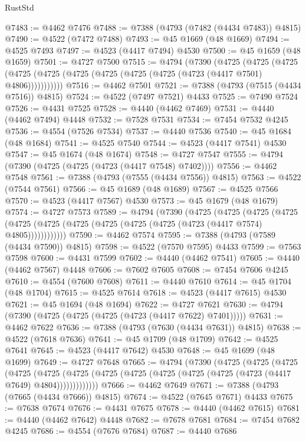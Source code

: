 \begin{lexlean}{RustStd}
\begin{coremodule}
{\begin{coremodule}
{{{{{{{{{{{{{{{{{{{{{{{{{{{{{{{{{{{{{{{{{{{{{{{{{{{{{{{{{{{{@7483 := @4462 @7476
@7488 := @7388 (@4793 (@7482 (@4434 @7483)) @4815)
@7490 := @4522 (@7472 @7488)
@7493 := @45 @1669 (@48 @1669)
@7494 := @4525 @7493
@7497 := @4523 (@4417 @7494) @4530
@7500 := @45 @1659 (@48 @1659)
@7501 := @4727 @7500
@7515 := @4794
    (@7390
      (@4725
        (@4725
          (@4725 (@4725 (@4725 (@4725 (@4725 (@4725 (@4725 (@4723 (@4417 @7501) @4806)))))))))))
@7516 := @4462 @7501
@7521 := @7388 (@4793 (@7515 (@4434 @7516)) @4815)
@7524 := @4522 (@7497 @7521) @4433
@7525 := @7490 @7524
@7526 := @4431 @7525
@7528 := @4440 (@4462 @7469)
@7531 := @4440 (@4462 @7494) @4448
@7532 := @7528 @7531
@7534 := @7454 @7532 @4245
@7536 := @4554 (@7526 @7534)
@7537 := @4440 @7536
@7540 := @45 @1684 (@48 @1684)
@7541 := @4525 @7540
@7544 := @4523 (@4417 @7541) @4530
@7547 := @45 @1674 (@48 @1674)
@7548 := @4727 @7547
@7555 := @4794 (@7390 (@4725 (@4725 (@4723 (@4417 @7548) @7402))))
@7556 := @4462 @7548
@7561 := @7388 (@4793 (@7555 (@4434 @7556)) @4815)
@7563 := @4522 (@7544 @7561)
@7566 := @45 @1689 (@48 @1689)
@7567 := @4525 @7566
@7570 := @4523 (@4417 @7567) @4530
@7573 := @45 @1679 (@48 @1679)
@7574 := @4727 @7573
@7589 := @4794
    (@7390
      (@4725
        (@4725
          (@4725
            (@4725 (@4725 (@4725 (@4725 (@4725 (@4725 (@4725 (@4723 (@4417 @7574) @4805))))))))))))
@7590 := @4462 @7574
@7595 := @7388 (@4793 (@7589 (@4434 @7590)) @4815)
@7598 := @4522 (@7570 @7595) @4433
@7599 := @7563 @7598
@7600 := @4431 @7599
@7602 := @4440 (@4462 @7541)
@7605 := @4440 (@4462 @7567) @4448
@7606 := @7602 @7605
@7608 := @7454 @7606 @4245
@7610 := @4554 (@7600 @7608)
@7611 := @4440 @7610
@7614 := @45 @1704 (@48 @1704)
@7615 := @4525 @7614
@7618 := @4523 (@4417 @7615) @4530
@7621 := @45 @1694 (@48 @1694)
@7622 := @4727 @7621
@7630 := @4794 (@7390 (@4725 (@4725 (@4725 (@4723 (@4417 @7622) @7401)))))
@7631 := @4462 @7622
@7636 := @7388 (@4793 (@7630 (@4434 @7631)) @4815)
@7638 := @4522 (@7618 @7636)
@7641 := @45 @1709 (@48 @1709)
@7642 := @4525 @7641
@7645 := @4523 (@4417 @7642) @4530
@7648 := @45 @1699 (@48 @1699)
@7649 := @4727 @7648
@7665 := @4794
    (@7390
      (@4725
        (@4725
          (@4725
            (@4725
              (@4725
                (@4725 (@4725 (@4725 (@4725 (@4725 (@4725 (@4723 (@4417 @7649) @4804)))))))))))))
@7666 := @4462 @7649
@7671 := @7388 (@4793 (@7665 (@4434 @7666)) @4815)
@7674 := @4522 (@7645 @7671) @4433
@7675 := @7638 @7674
@7676 := @4431 @7675
@7678 := @4440 (@4462 @7615)
@7681 := @4440 (@4462 @7642) @4448
@7682 := @7678 @7681
@7684 := @7454 @7682 @4245
@7686 := @4554 (@7676 @7684)
@7687 := @4440 @7686
}}}}}}}}}}}}}}}}}}}}}}}}}}}}}}}}}}}}}}}}}}}}}}}}}}}}}}}}}}}}
\end{coremodule}}
\end{coremodule}
\end{lexlean}
